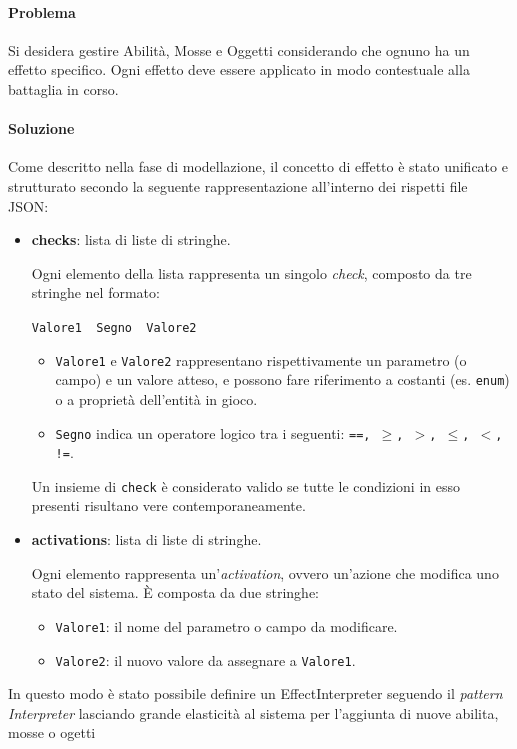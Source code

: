 \documentclass[a4paper,12pt]{report}
\begin{document}
{{\paragraph{Problema}
Si desidera gestire Abilità, Mosse e Oggetti considerando che ognuno ha un effetto specifico. Ogni effetto deve essere applicato in modo contestuale alla battaglia in corso.

\paragraph{Soluzione}
Come descritto nella fase di modellazione, il concetto di effetto è stato unificato e strutturato secondo la seguente rappresentazione all'interno dei rispetti file JSON:

\begin{itemize}
    \item \textbf{checks}: lista di liste di stringhe.

    Ogni elemento della lista rappresenta un singolo \textit{check}, composto da tre stringhe nel formato:
    \begin{center}
        \texttt{Valore1 \ Segno \ Valore2}
    \end{center}

    \begin{itemize}
        \item \texttt{Valore1} e \texttt{Valore2} rappresentano rispettivamente un parametro (o campo) e un valore atteso, e possono fare riferimento a costanti (es. \texttt{enum}) o a proprietà dell'entità in gioco.
        \item \texttt{Segno} indica un operatore logico tra i seguenti: \texttt{==, \(\geq\), \(>\), \(\leq\), \(<\), !=}.
    \end{itemize}

    Un insieme di \texttt{check} è considerato valido se tutte le condizioni in esso presenti risultano vere contemporaneamente.

    \item \textbf{activations}: lista di liste di stringhe.

    Ogni elemento rappresenta un’\textit{activation}, ovvero un'azione che modifica uno stato del sistema. È composta da due stringhe:
    \begin{itemize}
        \item \texttt{Valore1}: il nome del parametro o campo da modificare.
        \item \texttt{Valore2}: il nuovo valore da assegnare a \texttt{Valore1}.
    \end{itemize}
\end{itemize}In questo modo è stato possibile definire un EffectInterpreter seguendo il \textit{pattern Interpreter} lasciando grande elasticità al sistema per l'aggiunta di nuove abilita, mosse o ogetti
}}
\end{document}

